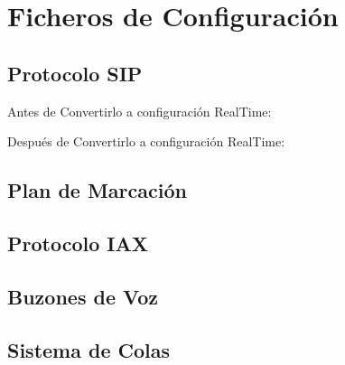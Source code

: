 
\section*{Ficheros de Configuración}

\subsection*{Protocolo SIP}

Antes de Convertirlo a configuración RealTime:



Después de Convertirlo a configuración RealTime:



\subsection*{Plan de Marcación}



\subsection*{Protocolo IAX}



\subsection*{Buzones de Voz}



\subsection*{Sistema de Colas}



